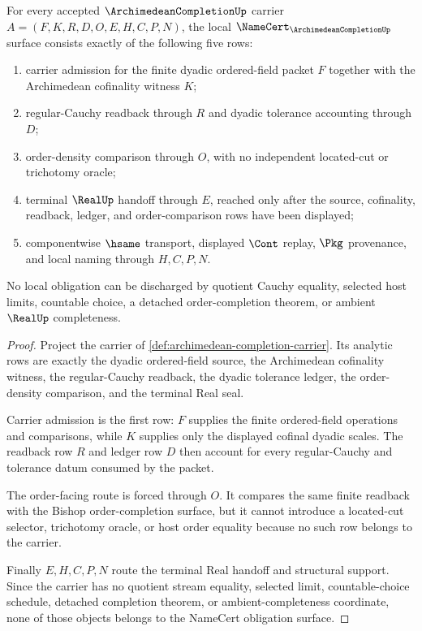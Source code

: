 \begin{theorem}
\label{thm:archimedean-completion-namecert-obligations}
For every accepted $\ArchimedeanCompletionUp$ carrier $A=(F,K,R,D,O,E,H,C,P,N)$, the local $\NameCert_{\ArchimedeanCompletionUp}$ surface consists exactly of the following five rows:
\begin{enumerate}
\item carrier admission for the finite dyadic ordered-field packet $F$ together with the Archimedean cofinality witness $K$;
\item regular-Cauchy readback through $R$ and dyadic tolerance accounting through $D$;
\item order-density comparison through $O$, with no independent located-cut or trichotomy oracle;
\item terminal $\RealUp$ handoff through $E$, reached only after the source, cofinality, readback, ledger, and order-comparison rows have been displayed;
\item componentwise $\hsame$ transport, displayed $\Cont$ replay, $\Pkg$ provenance, and local naming through $H,C,P,N$.
\end{enumerate}
No local obligation can be discharged by quotient Cauchy equality, selected host limits, countable choice, a detached order-completion theorem, or ambient $\RealUp$ completeness.
\end{theorem}
\begin{proof}
Project the carrier of \autoref{def:archimedean-completion-carrier}. Its analytic rows are exactly the dyadic ordered-field source, the Archimedean cofinality witness, the regular-Cauchy readback, the dyadic tolerance ledger, the order-density comparison, and the terminal Real seal.

Carrier admission is the first row: $F$ supplies the finite ordered-field operations and comparisons, while $K$ supplies only the displayed cofinal dyadic scales. The readback row $R$ and ledger row $D$ then account for every regular-Cauchy and tolerance datum consumed by the packet.

The order-facing route is forced through $O$. It compares the same finite readback with the Bishop order-completion surface, but it cannot introduce a located-cut selector, trichotomy oracle, or host order equality because no such row belongs to the carrier.

Finally $E,H,C,P,N$ route the terminal Real handoff and structural support. Since the carrier has no quotient stream equality, selected limit, countable-choice schedule, detached completion theorem, or ambient-completeness coordinate, none of those objects belongs to the NameCert obligation surface.
\end{proof}

